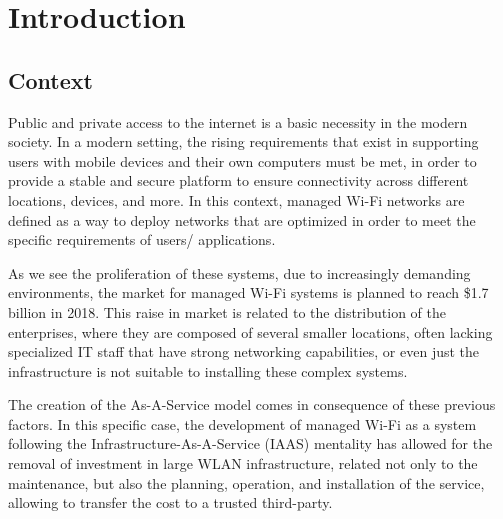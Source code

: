\chapter{Introduction} \label{chap:introduction} 
\hspace{0.5cm}


\section {Context} \label{context}
\hspace{0.5cm} 


Public and private access to the internet is a basic necessity in the modern society. In a modern setting, the rising requirements that exist in supporting users with mobile devices and their own computers must be met, in order to provide a stable and secure platform to ensure connectivity across different locations, devices, and more. In this context, managed Wi-Fi networks are defined as a way to deploy networks that are optimized in order to meet the specific requirements of users/ applications. 

\par As we see the proliferation of these systems, due to increasingly demanding environments, the market for managed Wi-Fi systems is planned to reach \$1.7 billion in 2018. This raise in market is related to the distribution of the enterprises, where they are composed of several smaller locations, often lacking specialized IT staff that have strong networking capabilities, or even just the infrastructure is not suitable to installing these complex systems.

\par The creation of the As-A-Service model comes in consequence of these previous factors. In this specific case, the development of managed Wi-Fi as a system following the Infrastructure-As-A-Service (IAAS) mentality has allowed for the removal of investment in large WLAN infrastructure, related not only to the maintenance, but also the planning, operation, and installation of the service, allowing to transfer the cost to a trusted third-party. 

